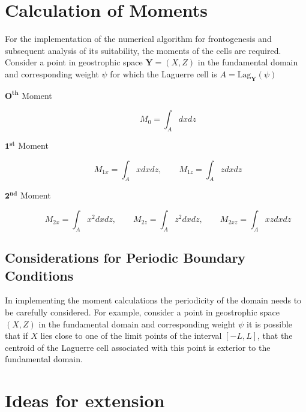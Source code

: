 \section{Calculation of Moments}
For the implementation of the numerical algorithm for frontogenesis and subsequent analysis of its suitability, the moments of  the cells are required. Consider a point in geostrophic space $\bm{Y} = \left(X,Z\right)$ in the fundamental domain and corresponding weight $\psi$ for which the Laguerre cell is $A = \mathrm{Lag}_{\bm{Y}}(\psi)$
\begin{description}
	\item [$\bm{O^{th}}$ Moment] 
	\begin{equation}
		M_0 = \int_A dxdz
	\end{equation}
	\item[$\bm{1^{st}}$ Moment]
	\begin{equation}
	M_{1x} = \int_A x dxdz, \qquad M_{1z} = \int_A z dxdz
	\end{equation}
	\item[$\bm{2^{nd}}$ Moment]
	\begin{equation}
	M_{2x} = \int_A x^2 dxdz, \qquad M_{2z} = \int_A z^2 dxdz, \qquad M_{2xz} = \int_A xz dxdz
	\end{equation}	
\end{description}

\subsection{Considerations for Periodic Boundary Conditions}
In implementing the moment calculations the periodicity of the domain needs to be carefully considered. For example, consider a point in geostrophic space $\left(X, Z\right)$ in the fundamental domain and corresponding weight $\psi$ it is possible that if $X$ lies close to one of the limit points of the interval $[-L,L]$, that the centroid of the Laguerre cell associated with this point is exterior to the fundamental domain.
\section{Ideas for extension}
